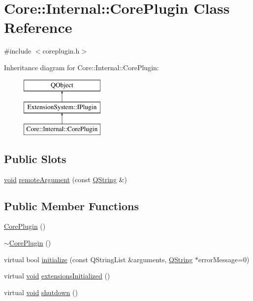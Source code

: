 \hypertarget{class_core_1_1_internal_1_1_core_plugin}{\section{Core\-:\-:Internal\-:\-:Core\-Plugin Class Reference}
\label{class_core_1_1_internal_1_1_core_plugin}
}


{\ttfamily \#include $<$coreplugin.\-h$>$}

Inheritance diagram for Core\-:\-:Internal\-:\-:Core\-Plugin\-:\begin{figure}[H]
\begin{center}
\leavevmode
\includegraphics[height=3.000000cm]{class_core_1_1_internal_1_1_core_plugin}
\end{center}
\end{figure}
\subsection*{Public Slots}
\begin{DoxyCompactItemize}
\item 
\hyperlink{group___u_a_v_objects_plugin_ga444cf2ff3f0ecbe028adce838d373f5c}{void} \hyperlink{group___core_plugin_gac1ee746ae92fbd6552ea417e4f377a0f}{remote\-Argument} (const \hyperlink{group___u_a_v_objects_plugin_gab9d252f49c333c94a72f97ce3105a32d}{Q\-String} \&)
\end{DoxyCompactItemize}
\subsection*{Public Member Functions}
\begin{DoxyCompactItemize}
\item 
\hyperlink{group___core_plugin_gaf6d8419d70a20ad1f422d1ba6910c99b}{Core\-Plugin} ()
\item 
\hyperlink{group___core_plugin_gafd4119882379715a42de4bad67235335}{$\sim$\-Core\-Plugin} ()
\item 
virtual bool \hyperlink{group___core_plugin_ga2ff3446eb96ef85ad12d4ad20da5ad15}{initialize} (const Q\-String\-List \&arguments, \hyperlink{group___u_a_v_objects_plugin_gab9d252f49c333c94a72f97ce3105a32d}{Q\-String} $\ast$error\-Message=0)
\item 
virtual \hyperlink{group___u_a_v_objects_plugin_ga444cf2ff3f0ecbe028adce838d373f5c}{void} \hyperlink{group___core_plugin_ga55b0e03148abe8106f161d21fe097dcb}{extensions\-Initialized} ()
\item 
virtual \hyperlink{group___u_a_v_objects_plugin_ga444cf2ff3f0ecbe028adce838d373f5c}{void} \hyperlink{group___core_plugin_ga792f6f751294fccbc48bb39e266e48b8}{shutdown} ()
\end{DoxyCompactItemize}


